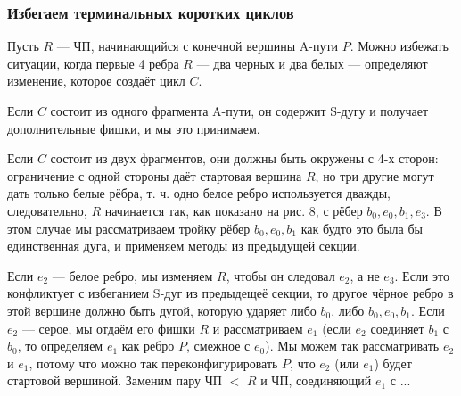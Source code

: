 \begin{proofstar}

\subsubsection{Избегаем терминальных коротких циклов}
\begin{stmt}
Пусть $R$ --- ЧП, начинающийся с конечной вершины A-пути $P$. Можно избежать ситуации, когда первые 4 ребра $R$ --- два черных и два белых --- определяют изменение, которое создаёт цикл $C$. 
\end{stmt}

\begin{proofstardetailed}
Если $C$ состоит из одного фрагмента A-пути, он содержит S-дугу и получает дополнительные фишки, и мы это принимаем.

Если $C$ состоит из двух фрагментов, они должны быть окружены с 4-х сторон: ограничение с одной стороны даёт стартовая вершина $R$, но три другие могут дать только белые рёбра, т. ч. одно белое ребро используется дважды, следовательно, $R$ начинается так, как показано на рис. 8, с рёбер $b_0, e_0, b_1, e_3$. В этом случае мы рассматриваем тройку рёбер $b_0, e_0, b_1$ как будто это была бы единственная дуга, и применяем методы из предыдущей секции.

Если $e_2$ --- белое ребро, мы изменяем $R$, чтобы он следовал $e_2$, а не $e_3$. Если это конфликтует с избеганием S-дуг из предыдещеё секции, то другое чёрное ребро в этой вершине должно быть дугой, которую ударяет либо $b_0$, либо $b_0, e_0, b_1$. Если $e_2$ --- серое, мы отдаём его фишки $R$ и рассматриваем $e_1$ (если $e_2$ соединяет $b_1$ с $b_0$, то определяем $e_1$ как ребро $P$, смежное с $e_0$). Мы можем так рассматривать $e_2$ и $e_1$, потому что можно так переконфигурировать $P$, что $e_2$ (или $e_1$) будет стартовой вершиной. Заменим пару ЧП $<$ $R$ и ЧП, соединяющий $e_1$ с ... 
\end{proofstardetailed}


\end{proofstar}

